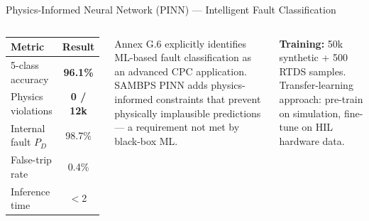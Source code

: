 \documentclass[aspectratio=169, 10pt]{beamer}
\newcommand{\ms}{\,\text{ms}}
\newcommand{\PD}{P_D}
\begin{document}
\begin{frame}{Physics-Informed Neural Network (PINN) --- Intelligent Fault Classification}
\begin{columns}[T]
\vspace{4pt}
\begin{tcolorbox}[resultbox, title={PINN Classification Results}]
{\footnotesize
\begin{tabular}{lc}
\toprule
\textbf{Metric} & \textbf{Result}\\
\midrule
5-class accuracy         & \textbf{96.1\%}\\
Physics violations       & \textbf{0 / 12k}\\
Internal fault $\PD$     & 98.7\%\\
False-trip rate          & 0.4\%\\
Inference time           & $<$2\ms\\
\bottomrule
\end{tabular}}
\end{tcolorbox}
\vspace{6pt}
\begin{tcolorbox}[cpcbox, title={CPC Link --- C37.300 Annex G.6}]
{\scriptsize Annex G.6 explicitly identifies ML-based fault
classification as an advanced CPC application. SAMBPS PINN
adds physics-informed constraints that prevent physically
implausible predictions --- a requirement not met by
black-box ML.}
\end{tcolorbox}
\vspace{5pt}
{\scriptsize\textbf{Training:} 50k synthetic + 500 RTDS samples.
Transfer-learning approach: pre-train on simulation, fine-tune
on HIL hardware data.}
\end{columns}
\end{frame}
\end{document}
